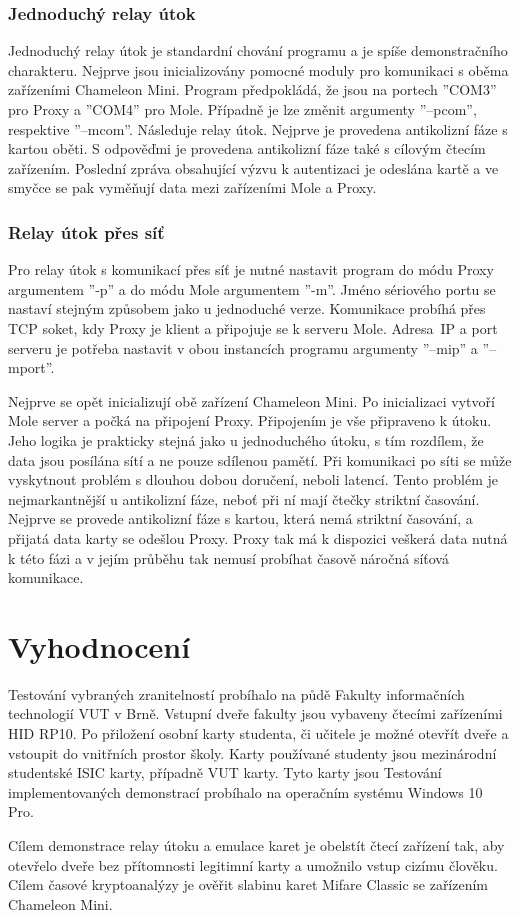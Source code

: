 \subsection*{Jednoduchý relay útok}
Jednoduchý relay útok je standardní chování programu a je spíše demonstračního charakteru. Nejprve jsou inicializovány pomocné moduly pro komunikaci s oběma zařízeními Chameleon Mini. Program předpokládá, že jsou na portech ''COM3'' pro Proxy a ''COM4'' pro Mole. Případně je lze změnit argumenty ''--pcom'', respektive ''--mcom''. Následuje relay útok. Nejprve je provedena antikolizní fáze s kartou oběti. S odpověďmi je provedena antikolizní fáze také s cílovým čtecím zařízením. Poslední zpráva obsahující výzvu k autentizaci je odeslána kartě a ve smyčce se pak vyměňují data mezi zařízeními Mole a Proxy.

\subsection*{Relay útok přes síť}
Pro relay útok s komunikací přes síť je nutné nastavit program do módu Proxy argumentem ''-p'' a do módu Mole argumentem ''-m''. Jméno sériového portu se nastaví stejným způsobem jako u jednoduché verze. Komunikace probíhá přes TCP soket, kdy Proxy je klient a připojuje se k serveru Mole. Adresa~IP a port serveru je potřeba nastavit v obou instancích programu argumenty ''--mip'' a ''--mport''. \par
Nejprve se opět inicializují obě zařízení Chameleon Mini. Po inicializaci vytvoří Mole server a počká na připojení Proxy. Připojením je vše připraveno k útoku. Jeho logika je prakticky stejná jako u jednoduchého útoku, s tím rozdílem, že data jsou posílána sítí a ne pouze sdílenou pamětí. Při komunikaci po síti se může vyskytnout problém s dlouhou dobou doručení, neboli latencí. Tento problém je nejmarkantnější u antikolizní fáze, neboť při ní mají čtečky striktní časování. Nejprve se provede antikolizní fáze s kartou, která nemá striktní časování, a přijatá data karty se odešlou Proxy. Proxy tak má k dispozici veškerá data nutná k této fázi a v jejím průběhu tak nemusí probíhat časově náročná síťová komunikace. 


    \chapter{Vyhodnocení}
Testování vybraných zranitelností probíhalo na půdě Fakulty informačních technologií VUT v Brně. Vstupní dveře fakulty jsou vybaveny čtecími zařízeními HID RP10\footnotemark. Po přiložení osobní karty studenta, či učitele je možné otevřít dveře a vstoupit do vnitřních prostor školy. Karty používané studenty jsou mezinárodní studentské ISIC karty, případně VUT karty. Tyto karty jsou  Testování implementovaných demonstrací probíhalo na operačním systému Windows 10 Pro.\par
Cílem demonstrace relay útoku a emulace karet je obelstít čtecí zařízení tak, aby otevřelo dveře bez přítomnosti legitimní karty a umožnilo vstup cizímu člověku. Cílem časové kryptoanalýzy je ověřit slabinu karet Mifare Classic se zařízením Chameleon Mini.

